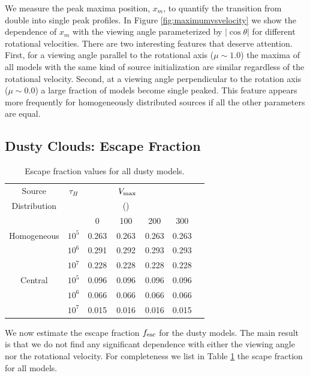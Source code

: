 \documentclass{emulateapj}
\newcommand{\kms}{{\ifmmode{{\mathrm{\,km\ s}^{-1}}}\else{\,km~s$^{-1}$}\fi}}
\begin{document}
We measure the peak maxima position, $x_m$, to quantify the transition from
double into single peak profiles. 
In Figure \ref{fig:maximumvsvelocity} we show the dependence of $x_m$ with
the viewing angle parameterized by $|\cos\theta|$ for different
rotational velocities.
There are two interesting features that deserve attention. 
First, for a viewing angle parallel to the rotational axis ($\mu\sim
1.0$) the maxima of all models with the same kind of source
initialization are similar regardless of the rotational velocity.  
Second, at a viewing angle perpendicular to the rotation axis ($\mu\sim 0.0$) a
large fraction of models become single peaked. 
This feature appears more frequently for homogeneously distributed
sources if all the other parameters are equal. 

\subsection{Dusty Clouds: Escape Fraction}
\label{sec:escapefraction}

\begin{table}
\begin{center}
\begin{tabular}{c cccccc}
\hline \hline
Source & $\tau_{H}$ & &  $\ V_{\rm max}$& & \\
Distribution& &    & (\kms) & & \\ 
& & 0 & 100 &200 & 300\\ \hline 
Homogeneous & $10^{5}$& 0.263 &  0.263 &  0.263 &  0.263  \\
            & $10^{6}$ & 0.291 &   0.292 &  0.293 &  0.293 \\
            &$10^{7}$ &  0.228 &  0.228 &  0.228 &  0.228 \\
Central & $10^{5}$ &  0.096 & 0.096 &  0.096 & 0.096 \\
  		&$10^{6}$ & 0.066 &  0.066 &  0.066 &  0.066 \\
 		&$10^{7}$ & 0.015 & 0.016 & 0.016 & 0.015 \\
\hline
\end{tabular}
\caption{
 Escape fraction values for all dusty models. } 
\label{table:escape}
\end{center}
\end{table}

We now estimate the escape fraction $f_{\rm esc}$ for the dusty
models. 
The main  result is that we do not find any significant dependence
with either the viewing angle nor the rotational velocity.  
For completeness we list in Table \ref{table:escape} the scape
fraction for all models.
\end{document}
